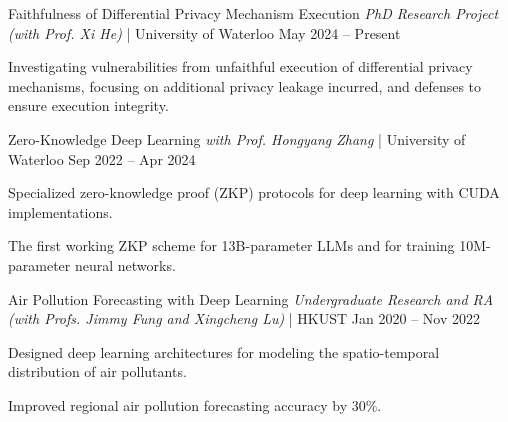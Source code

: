 
\begin{cventries2}

  \cventrynew
    {Faithfulness of Differential Privacy Mechanism Execution \textnormal{\textit{PhD Research Project (with Prof. Xi He)} | University of Waterloo}} 
    {May 2024 – Present}
    {
      \begin{cvitems}
        \item {Investigating vulnerabilities from unfaithful execution of differential privacy mechanisms, focusing on additional privacy leakage incurred, and defenses to ensure execution integrity.}
      \end{cvitems}
    }

  \cventrynew
    {Zero-Knowledge Deep Learning \textnormal{\textit{with Prof. Hongyang Zhang} | University of Waterloo}} 
    {Sep 2022 – Apr 2024}
    {
      \begin{cvitems}
        \item {Specialized zero-knowledge proof (ZKP) protocols for deep learning with CUDA implementations.}
        \item {The first working ZKP scheme for 13B-parameter LLMs and for training 10M-parameter neural networks.}
      \end{cvitems}
    }


  \cventrynew
    {Air Pollution Forecasting with Deep Learning \textnormal{\textit{Undergraduate Research and RA (with Profs. Jimmy Fung and Xingcheng Lu)} | HKUST}} 
    {Jan 2020 – Nov 2022}
    {
      \begin{cvitems}
        \item {Designed deep learning architectures for modeling the spatio-temporal distribution of air pollutants.}
        \item {Improved regional air pollution forecasting accuracy by 30\%.}
      \end{cvitems}
    }

\end{cventries2}
